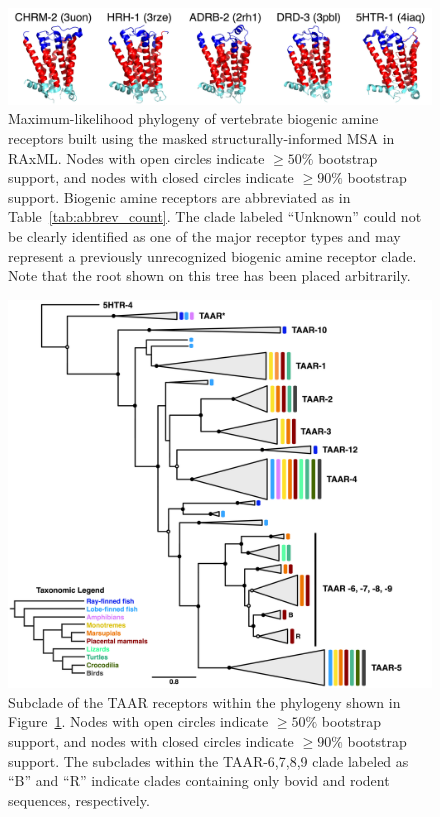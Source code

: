 \documentclass[fleqn,10pt]{wlpeerj}
\begin{document}
\newpage

\begin{figure}[htbp]
	\centerline{\includegraphics[width=18cm]{../figures/Figure1.png}}
	\caption{\label{phylogeny} Maximum-likelihood phylogeny of vertebrate biogenic amine receptors built using the masked structurally-informed MSA in RAxML. Nodes with open circles indicate $\geq 50\%$ bootstrap support, and nodes with closed circles indicate $\geq 90\%$ bootstrap support. Biogenic amine receptors are abbreviated as in Table~\ref{tab:abbrev_count}. The clade labeled ``Unknown'' could not be clearly identified as one of the major receptor types and may represent a previously unrecognized biogenic amine receptor clade. Note that the root shown on this tree has been placed arbitrarily.}
\end{figure}


\newpage

\begin{figure}[htbp]
	\centerline{\includegraphics[width=15cm]{../figures/taar_taxonomy.png}}
	\caption{\label{taar_tree} Subclade of the TAAR receptors within the phylogeny shown in Figure~\ref{phylogeny}. Nodes with open circles indicate $\geq 50\%$ bootstrap support, and nodes with closed circles indicate $\geq 90\%$ bootstrap support. The subclades within the TAAR-6,7,8,9 clade labeled as ``B'' and ``R'' indicate clades containing only bovid and rodent sequences, respectively.}
\end{figure}
\end{document}
